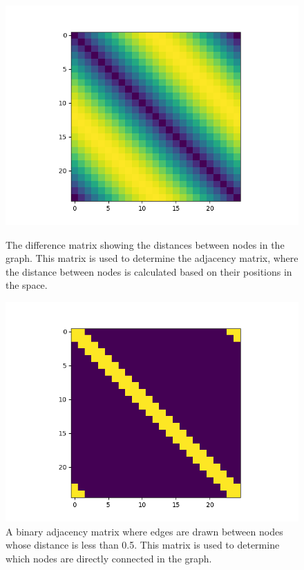 \begin{figure}[h!]
    \centering
    \begin{minipage}{0.45\textwidth}
        \centering
        \includegraphics[width=\textwidth]{images/diff_matrix.png}
        \caption{The difference matrix showing the distances between nodes in the graph. This matrix is used to determine the adjacency matrix, where the distance between nodes is calculated based on their positions in the space.}
        \label{fig:diff_matrix}
    \end{minipage} \hfill
    \begin{minipage}{0.45\textwidth}
        \centering
        \includegraphics[width=\textwidth]{images/diff_matrix_smaller_const.png}
        \caption{A binary adjacency matrix where edges are drawn between nodes whose distance is less than 0.5. This matrix is used to determine which nodes are directly connected in the graph.}
        \label{fig:diff_matrix_smaller}
    \end{minipage}
\end{figure}

